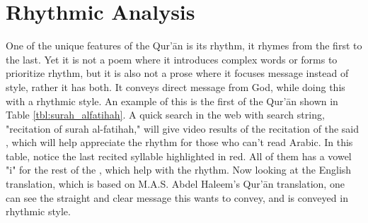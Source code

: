 \section{Rhythmic Analysis}\label{sec:method_rhythmic_analysis}
One of the unique features of the Qur'\=an is its rhythm, it rhymes from the first   to the last. Yet it is not a poem where it introduces complex words or forms to prioritize rhythm, but it is also not a prose where it focuses message instead of style, rather it has both. It conveys direct message from God, while doing this with a rhythmic style. An example of this is the first   of the Qur'\=an shown in Table \ref{tbl:surah_alfatihah}. A quick search in the web with search string, "recitation of surah al-fatihah," will give video results of the recitation of the said  , which will help appreciate the rhythm for those who can't read Arabic. In this table, notice the last recited syllable highlighted in red. All of them has a vowel "i" for the rest of the  , which help with the rhythm. Now looking at the English translation, which is based on M.A.S. Abdel Haleem's Qur'\=an translation, one can see the straight and clear message this   wants to convey, and is conveyed in rhythmic style. 


